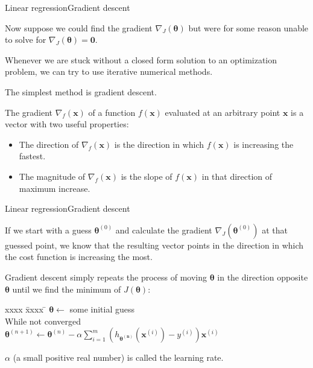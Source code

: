 \documentclass{beamer}
\renewcommand{\vec}[1]{\boldsymbol{#1}}
\begin{document}
\begin{frame}{Linear regression}{Gradient descent}

  Now suppose we could find the gradient $\nabla_J(\vec{\theta})$ but
  were for some reason unable to solve for $\nabla_J(\vec{\theta}) = \vec{0}$.

  \medskip

  Whenever we are stuck without a closed form solution to an optimization
  problem, we can try to use iterative numerical methods.

  \medskip

  The simplest method is \alert{gradient descent}.

  \medskip

  The \alert{gradient} $\nabla_f(\vec{x})$ of a function $f(\vec{x})$
  evaluated at an arbitrary point $\vec{x}$ is a vector with two
  useful properties:
  \begin{itemize}
  \item The \alert{direction} of $\nabla_f(\vec{x})$ is the direction
    in which $f(\vec{x})$ is increasing the fastest.
  \item The \alert{magnitude} of $\nabla_f(\vec{x})$ is the slope
    of $f(\vec{x})$ in that direction of maximum increase.
  \end{itemize}

\end{frame}


\begin{frame}{Linear regression}{Gradient descent}

  If we start with a guess $\vec{\theta}^{(0)}$ and calculate the gradient
  $\nabla_J(\vec{\theta}^{(0)})$ at that guessed point, we know that the
  resulting vector points in the direction in which the cost function is
  increasing the most.

  \medskip

  Gradient descent simply repeats the process of moving $\vec{\theta}$
  in the direction \alert{opposite} $\vec{\theta}$ until we find the
  minimum of $J(\vec{\theta})$:
  
  \begin{tabbing}
    xxxx \= xxxx \= \kill
    $\vec{\theta} \leftarrow$ some initial guess \\
    While not converged \\
    \> $\vec{\theta}^{(n+1)} \leftarrow \vec{\theta}^{(n)} - \alpha \sum_{i=1}^m (h_{\vec{\theta^{(n)}}}(\vec{x}^{(i)}) - y^{(i)})\vec{x}^{(i)}$ 
  \end{tabbing}

  $\alpha$ (a small positive real number) is called the \alert{learning rate}.
  
\end{frame}
\end{document}
